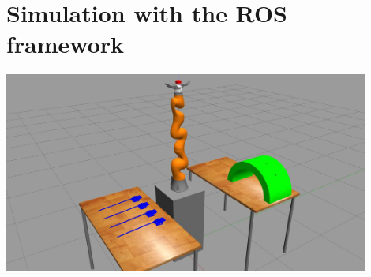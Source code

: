\section{Simulation with the ROS framework}

\begin{center}
\includegraphics[width=12cm]{images/gazebo-sim1.jpg}\\[1cm]
\end{center}